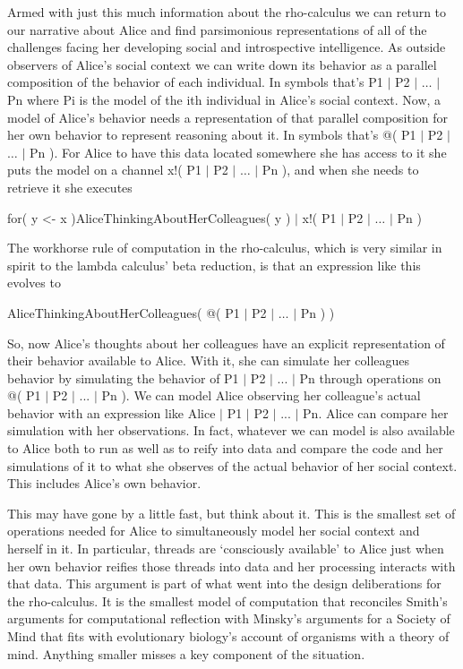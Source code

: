 \documentclass[runningheads]{llncs}
\begin{document}
\vspace{1\baselineskip}
Armed with just this much information about the rho-calculus we can return to our narrative about Alice and find parsimonious representations of all of the challenges facing her developing social and introspective intelligence. As outside observers of Alice’s social context we can write down its behavior as a parallel composition of the behavior of each individual. In symbols that’s P1 $\vert$ P2 $\vert$ $\ldots$ $\vert$ Pn where Pi is the model of the ith individual in Alice’s social context. Now, a model of Alice’s behavior needs a representation of that parallel composition for her own behavior to represent reasoning about it. In symbols that’s @( P1 $\vert$ P2 $\vert$ $\ldots$ $\vert$ Pn ). For Alice to have this data located somewhere she has access to it she puts the model on a channel x!( P1 $\vert$ P2 $\vert$ $\ldots$ $\vert$ Pn ), and when she needs to retrieve it she executes

\vspace{1\baselineskip}
for( y <- x )AliceThinkingAboutHerColleagues( y ) $\vert$ x!( P1 $\vert$ P2 $\vert$ $\ldots$ $\vert$ Pn )

\vspace{1\baselineskip}
The workhorse rule of computation in the rho-calculus, which is very similar in spirit to the lambda calculus’ beta reduction, is that an expression like this evolves to

\vspace{1\baselineskip}
AliceThinkingAboutHerColleagues( @( P1 $\vert$ P2 $\vert$ $\ldots$ $\vert$ Pn ) )

\vspace{1\baselineskip}
So, now Alice’s thoughts about her colleagues have an explicit representation of their behavior available to Alice. With it, she can simulate her colleagues behavior by simulating the behavior of P1 $\vert$ P2 $\vert$ ... $\vert$ Pn through operations on @( P1 $\vert$ P2 $\vert$ ... $\vert$ Pn ). We can model Alice observing her colleague’s actual behavior with an expression like Alice $\vert$ P1 $\vert$ P2 $\vert$ ... $\vert$ Pn. Alice can compare her simulation with her observations. In fact, whatever we can model is also available to Alice both to run as well as to reify into data and compare the code and her simulations of it to what she observes of the actual behavior of her social context. This includes Alice’s own behavior. 

\vspace{1\baselineskip}
This may have gone by a little fast, but think about it. This is the smallest set of operations needed for Alice to simultaneously model her social context and herself in it. In particular, threads are ‘consciously available’ to Alice just when her own behavior reifies those threads into data and her processing interacts with that data. This argument is part of what went into the design deliberations for the rho-calculus. It is the smallest model of computation that reconciles Smith’s arguments for computational reflection with Minsky’s arguments for a Society of Mind that fits with evolutionary biology’s account of organisms with a theory of mind. Anything smaller misses a key component of the situation.
\end{document}
